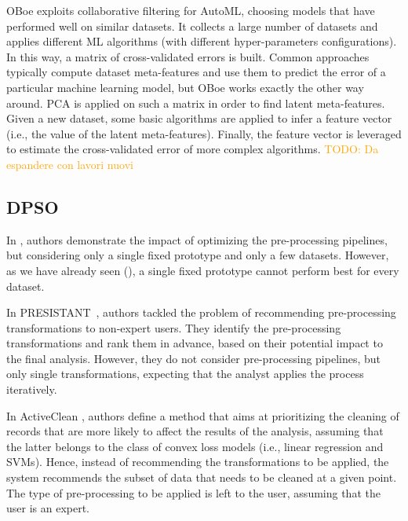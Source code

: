 OBoe \cite{yang2019oboe} exploits collaborative filtering for AutoML, choosing models that have performed well on similar datasets.
It collects a large number of datasets and applies different ML algorithms (with different hyper-parameters configurations).
In this way, a matrix of cross-validated errors is built.
Common approaches typically compute dataset meta-features and use them to predict the error of a particular machine learning model, but OBoe works exactly the other way around.
PCA is applied on such a matrix in order to find latent meta-features.
Given a new dataset, some basic algorithms are applied to infer a feature vector (i.e., the value of the latent meta-features).
Finally, the feature vector is leveraged to estimate the cross-validated error of more complex algorithms.
\textcolor{orange}{TODO: Da espandere con lavori nuovi}

\subsection{DPSO}
\label{effective-ssec:dpso}

In \cite{Quemy20InfSystems}, authors demonstrate the impact of optimizing the pre-processing pipelines, but considering only a single fixed prototype and only a few datasets.
However, as we have already seen (), a single fixed prototype cannot perform best for every dataset.

In PRESISTANT~\cite{presistant18CSI,presistant18CAISE,presistant19DKE}, authors tackled the problem of recommending pre-processing transformations to non-expert users.
They identify the pre-processing transformations and rank them in advance, based on their potential impact to the final analysis.
However, they do not consider pre-processing pipelines, but only single transformations, expecting that the analyst applies the process iteratively.

In ActiveClean \cite{ActiveClean16PVLDB}, authors define a method that aims at prioritizing the cleaning of records that are more likely to affect the results of the analysis, assuming that the latter belongs to the class of convex loss models (i.e., linear regression and SVMs).
Hence, instead of recommending the transformations to be applied, the system recommends the subset of data that needs to be cleaned at a given point.
The type of pre-processing to be applied is left to the user, assuming that the user is an expert.

